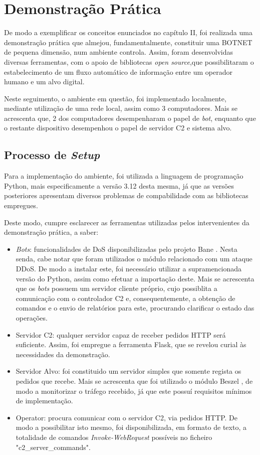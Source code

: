 \section{Demonstração Prática}
De modo a exemplificar os conceitos enunciados no capítulo II, foi realizada uma demonstração prática que almejou, fundamentalmente, constituir uma BOTNET de pequena dimensão, num ambiente controla. Assim, foram desenvolvidas diversas ferramentas, com o apoio de bibliotecas \textit{open source},que possibilitaram o estabelecimento de um fluxo automático de informação entre um operador humano e um alvo digital.

Neste seguimento, o ambiente em questão, foi implementado localmente, mediante utilização de uma rede local, assim como 3 computadores. Mais se acrescenta que, 2 dos computadores desempenharam o papel de \textit{bot}, enquanto que o restante dispositivo desempenhou o papel de servidor C2 e sistema alvo.

\subsection{Processo de \textit{Setup}}
Para a implementação do ambiente, foi utilizada a linguagem de programação Python, mais especificamente a versão 3.12 desta mesma, já que as versões posteriores apresentam diversos problemas de compabilidade com as bibliotecas empregues.


Deste modo, cumpre esclarecer as ferramentas utilizadas pelos intervenientes da demonstração prática, a saber:
\begin{itemize}
    \item \textit{Bots}: funcionalidades de DoS disponibilizadas pelo projeto Bane \cite{github_bane}. Nesta senda, cabe notar que foram utilizados o módulo relacionado com um ataque DDoS. De modo a instalar este, foi necessário utilizar a supramencionada versão do Python, assim como efetuar a importação deste. Mais se acrescenta que os \textit{bots} possuem um servidor cliente próprio, cujo possiblita a comunicação com o controlador C2 e, consequentemente, a obtenção de comandos e o envio de relatórios para este, procurando clarificar o estado das operações.
    \item Servidor C2: qualquer servidor capaz de receber pedidos HTTP será suficiente. Assim, foi empregue a ferramenta Flask, que se revelou curial às necessidades da demonstração.
    \item Servidor Alvo: foi constituido um servidor simples que somente regista os pedidos que recebe. Mais se acrescenta que foi utilizado o módulo Beszel \cite{github_beszel}, de modo a monitorizar o tráfego recebido, já que este possuí requisitos mínimos de implementação.
    \item Operator: procura comunicar com o servidor C2, via pedidos HTTP. De modo a possibilitar isto mesmo, foi disponibilizada, em formato de texto, a totalidade de comandos \textit{Invoke-WebRequest} possíveis no ficheiro "c2\_server\_commands".
\end{itemize}

